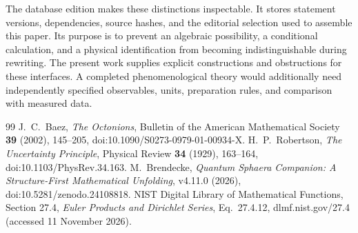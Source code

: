 \documentclass[11pt,a4paper]{article}
\begin{document}
The database edition makes these distinctions inspectable. It
stores statement versions, dependencies, source hashes, and the
editorial selection used to assemble this paper. Its purpose is to
prevent an algebraic possibility, a conditional calculation, and
a physical identification from becoming indistinguishable during
rewriting. The present work supplies explicit constructions and
obstructions for these interfaces. A completed phenomenological
theory would additionally need independently specified observables,
units, preparation rules, and comparison with measured data.
\begin{thebibliography}{99}
J.~C.~Baez, \emph{The Octonions}, Bulletin of the American Mathematical
Society \textbf{39} (2002), 145--205,
doi:10.1090/S0273-0979-01-00934-X.
H.~P.~Robertson, \emph{The Uncertainty Principle}, Physical Review
\textbf{34} (1929), 163--164, doi:10.1103/PhysRev.34.163.
M.~Brendecke, \emph{Quantum Sphaera Companion: A Structure-First Mathematical
Unfolding}, v4.11.0 (2026), doi:10.5281/zenodo.24108818.
NIST Digital Library of Mathematical Functions, Section 27.4,
\emph{Euler Products and Dirichlet Series}, Eq.~27.4.12,
dlmf.nist.gov/27.4 (accessed 11 November 2026).
\end{thebibliography}
\clearpage
\appendix
\end{document}
